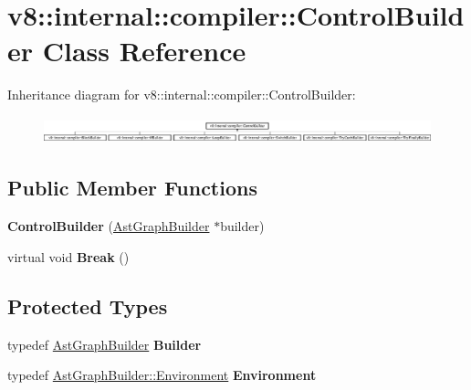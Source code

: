 \hypertarget{classv8_1_1internal_1_1compiler_1_1_control_builder}{}\section{v8\+:\+:internal\+:\+:compiler\+:\+:Control\+Builder Class Reference}
\label{classv8_1_1internal_1_1compiler_1_1_control_builder}
Inheritance diagram for v8\+:\+:internal\+:\+:compiler\+:\+:Control\+Builder\+:\begin{figure}[H]
\begin{center}
\leavevmode
\includegraphics[height=0.781032cm]{classv8_1_1internal_1_1compiler_1_1_control_builder}
\end{center}
\end{figure}
\subsection*{Public Member Functions}
\begin{DoxyCompactItemize}
\item 
{\bfseries Control\+Builder} (\hyperlink{classv8_1_1internal_1_1compiler_1_1_ast_graph_builder}{Ast\+Graph\+Builder} $\ast$builder)\hypertarget{classv8_1_1internal_1_1compiler_1_1_control_builder_a5f5f650c7fdd4b3116be78df60007e61}{}\label{classv8_1_1internal_1_1compiler_1_1_control_builder_a5f5f650c7fdd4b3116be78df60007e61}

\item 
virtual void {\bfseries Break} ()\hypertarget{classv8_1_1internal_1_1compiler_1_1_control_builder_a7837820511b2baaf94a8fd99d0c4d54b}{}\label{classv8_1_1internal_1_1compiler_1_1_control_builder_a7837820511b2baaf94a8fd99d0c4d54b}

\end{DoxyCompactItemize}
\subsection*{Protected Types}
\begin{DoxyCompactItemize}
\item 
typedef \hyperlink{classv8_1_1internal_1_1compiler_1_1_ast_graph_builder}{Ast\+Graph\+Builder} {\bfseries Builder}\hypertarget{classv8_1_1internal_1_1compiler_1_1_control_builder_acc5998ae08fbd0559e0c34538aa18c07}{}\label{classv8_1_1internal_1_1compiler_1_1_control_builder_acc5998ae08fbd0559e0c34538aa18c07}

\item 
typedef \hyperlink{classv8_1_1internal_1_1compiler_1_1_ast_graph_builder_1_1_environment}{Ast\+Graph\+Builder\+::\+Environment} {\bfseries Environment}\hypertarget{classv8_1_1internal_1_1compiler_1_1_control_builder_af58570131d71ef11ab530fbe2ff47955}{}\label{classv8_1_1internal_1_1compiler_1_1_control_builder_af58570131d71ef11ab530fbe2ff47955}

\end{DoxyCompactItemize}
